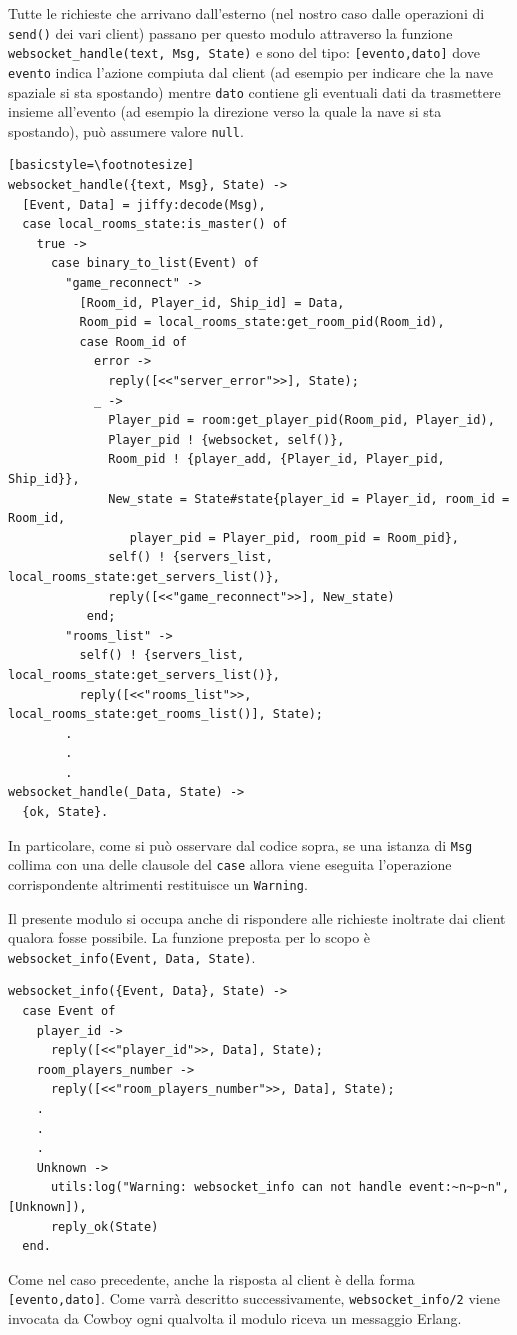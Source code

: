 \documentclass[paper=a4, fontsize=11pt]{scrartcl} %
\numberwithin{equation}{section} %
\numberwithin{figure}{section} %
\numberwithin{table}{section} %
\begin{document}
Tutte le richieste che arrivano dall'esterno (nel nostro caso dalle operazioni di \texttt{send()} dei vari client) passano per questo modulo attraverso la funzione \texttt{websocket\_handle({text, Msg}, State)} e sono del tipo: \texttt{[evento,dato]} dove \texttt{evento} indica l'azione compiuta dal client (ad esempio per indicare che la nave spaziale si sta spostando) mentre \texttt{dato} contiene gli eventuali dati da trasmettere insieme all'evento (ad esempio la direzione verso la quale la nave si sta spostando), può assumere valore \texttt{null}.
\begin{lstlisting}[basicstyle=\footnotesize][basicstyle=\footnotesize]
websocket_handle({text, Msg}, State) ->
  [Event, Data] = jiffy:decode(Msg),
  case local_rooms_state:is_master() of
    true ->
      case binary_to_list(Event) of
        "game_reconnect" ->
          [Room_id, Player_id, Ship_id] = Data,
          Room_pid = local_rooms_state:get_room_pid(Room_id),
          case Room_id of
            error ->
              reply([<<"server_error">>], State);
            _ ->
              Player_pid = room:get_player_pid(Room_pid, Player_id),
              Player_pid ! {websocket, self()},
              Room_pid ! {player_add, {Player_id, Player_pid, Ship_id}},
              New_state = State#state{player_id = Player_id, room_id = Room_id,
              	 player_pid = Player_pid, room_pid = Room_pid},
              self() ! {servers_list, local_rooms_state:get_servers_list()},
              reply([<<"game_reconnect">>], New_state)
           end;
        "rooms_list" ->
          self() ! {servers_list, local_rooms_state:get_servers_list()},
          reply([<<"rooms_list">>, local_rooms_state:get_rooms_list()], State);
        .
        .
        .
websocket_handle(_Data, State) ->
  {ok, State}.
\end{lstlisting}
In particolare, come si può osservare dal codice sopra, se una istanza di \texttt{Msg} collima con una delle clausole del \texttt{case} allora viene eseguita l'operazione corrispondente altrimenti restituisce un \texttt{Warning}.


Il presente modulo si occupa anche di rispondere alle richieste inoltrate dai client qualora fosse possibile. La funzione preposta per lo scopo è \texttt{websocket\_info({Event, Data}, State)}.
\begin{lstlisting}[basicstyle=\footnotesize]
websocket_info({Event, Data}, State) ->
  case Event of
    player_id ->
      reply([<<"player_id">>, Data], State);
    room_players_number ->
      reply([<<"room_players_number">>, Data], State);
    .
    .
    .
    Unknown ->
      utils:log("Warning: websocket_info can not handle event:~n~p~n", [Unknown]),
      reply_ok(State)
  end.
\end{lstlisting}
Come nel caso precedente, anche la risposta al client è della forma \texttt{[evento,dato]}. Come varrà descritto successivamente, \texttt{websocket\_info/2} viene invocata da Cowboy ogni qualvolta il modulo riceva un messaggio Erlang.
\end{document}
